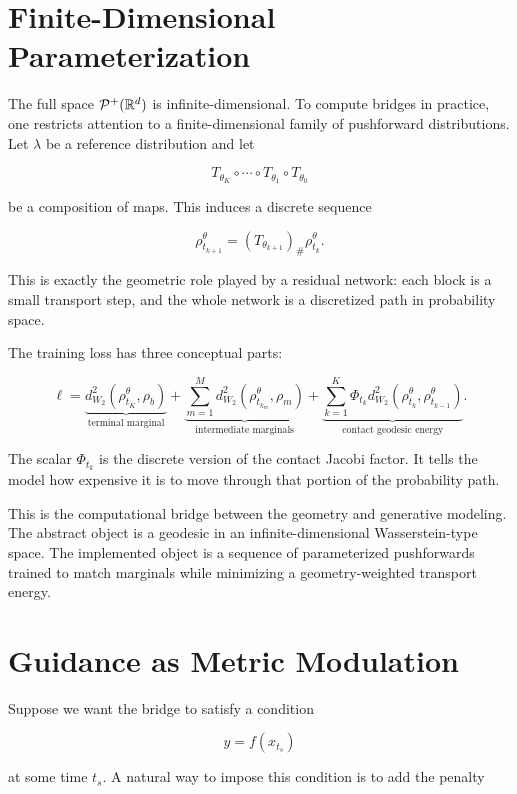 \section{Finite-Dimensional Parameterization}

The full space $\mathcal{P}^+(\mathbb{R}^d)$ is infinite-dimensional. To compute bridges in
practice, one restricts attention to a finite-dimensional family of
pushforward distributions. Let $\lambda$ be a reference distribution and let

\[
T_{\theta_K}\circ\cdots\circ T_{\theta_1}\circ T_{\theta_0}
\]

be a composition of maps. This induces a discrete sequence

\[
\rho^{\theta}_{t_{k+1}}
=
(T_{\theta_{k+1}})_\#
\rho^{\theta}_{t_k}.
\]

This is exactly the geometric role played by a residual network: each block is
a small transport step, and the whole network is a discretized path in
probability space.

The training loss has three conceptual parts:

\[
\ell
=
\underbrace{
d_{W_2}^2(\rho^\theta_{t_K},\rho_b)
}_{\text{terminal marginal}}
+
\underbrace{
\sum_{m=1}^M
d_{W_2}^2(\rho^\theta_{t_{k_m}},\rho_m)
}_{\text{intermediate marginals}}
+
\underbrace{
\sum_{k=1}^K
\Phi_{t_k}
d_{W_2}^2(\rho^\theta_{t_k},\rho^\theta_{t_{k-1}})
}_{\text{contact geodesic energy}}.
\]

The scalar $\Phi_{t_k}$ is the discrete version of the contact Jacobi factor.
It tells the model how expensive it is to move through that portion of the
probability path.

\begin{remark}
This is the computational bridge between the geometry and generative modeling.
The abstract object is a geodesic in an infinite-dimensional Wasserstein-type
space. The implemented object is a sequence of parameterized pushforwards
trained to match marginals while minimizing a geometry-weighted transport
energy.
\end{remark}

\section{Guidance as Metric Modulation}

Suppose we want the bridge to satisfy a condition

\[
y=f(x_{t_s})
\]

at some time $t_s$. A natural way to impose this condition is to add the
penalty

